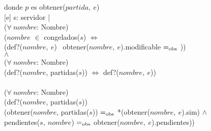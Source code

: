 \begin{Representacion}
    \vspace{2mm}
    donde $p$ es obtener($partida,\ e$) \\

    [e]{
        s: servidor | \\
            \tab ($\forall\ nombre$: Nombre)\\
                \tab\tab ($nombre$ $\in$ congelados($s$) $\Leftrightarrow$ \\
                \tab\tab (def?($nombre,\ e$) \yluego\ obtener($nombre,\ e$).modificable $=_{\mathrm{obs}}$ \false)) \\
            \tab $\wedge$ \\
            \tab ($\forall\ nombre$: Nombre)\\
                \tab\tab (def?($nombre$, partidas($s$)) $\Leftrightarrow$ def?($nombre,\ e$)) \\
            \tab \yluego \\
            \tab ($\forall\ nombre$: Nombre)\\
                \tab\tab (def?($nombre$, partidas($s$)) \impluego \\ 
                \tab\tab (obtener($nombre$, partidas($s$)) $=_{\mathrm{obs}}$ *(obtener($nombre,\ e$).sim) $\wedge$ \\
                \tab\tab pendientes($s,\ nombre$) $=_{\mathrm{obs}}$ obtener($nombre,\ e$).pendientes)) \\
    }
  
  \end{Representacion}